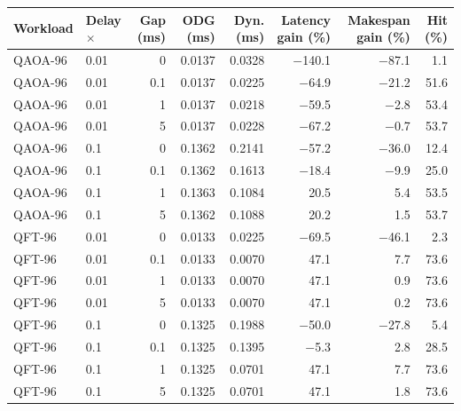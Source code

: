 \begin{tabular}{llrrrrrr}
\toprule
Workload & Delay $\times$ & Gap (ms) & ODG (ms) & Dyn. (ms) & Latency gain (\%) & Makespan gain (\%) & Hit (\%) \\
\midrule
QAOA-96 & 0.01 & 0 & 0.0137 & 0.0328 & $-$140.1 & $-$87.1 & 1.1 \\
QAOA-96 & 0.01 & 0.1 & 0.0137 & 0.0225 & $-$64.9 & $-$21.2 & 51.6 \\
QAOA-96 & 0.01 & 1 & 0.0137 & 0.0218 & $-$59.5 & $-$2.8 & 53.4 \\
QAOA-96 & 0.01 & 5 & 0.0137 & 0.0228 & $-$67.2 & $-$0.7 & 53.7 \\
QAOA-96 & 0.1 & 0 & 0.1362 & 0.2141 & $-$57.2 & $-$36.0 & 12.4 \\
QAOA-96 & 0.1 & 0.1 & 0.1362 & 0.1613 & $-$18.4 & $-$9.9 & 25.0 \\
QAOA-96 & 0.1 & 1 & 0.1363 & 0.1084 & 20.5 & 5.4 & 53.5 \\
QAOA-96 & 0.1 & 5 & 0.1362 & 0.1088 & 20.2 & 1.5 & 53.7 \\
QFT-96 & 0.01 & 0 & 0.0133 & 0.0225 & $-$69.5 & $-$46.1 & 2.3 \\
QFT-96 & 0.01 & 0.1 & 0.0133 & 0.0070 & 47.1 & 7.7 & 73.6 \\
QFT-96 & 0.01 & 1 & 0.0133 & 0.0070 & 47.1 & 0.9 & 73.6 \\
QFT-96 & 0.01 & 5 & 0.0133 & 0.0070 & 47.1 & 0.2 & 73.6 \\
QFT-96 & 0.1 & 0 & 0.1325 & 0.1988 & $-$50.0 & $-$27.8 & 5.4 \\
QFT-96 & 0.1 & 0.1 & 0.1325 & 0.1395 & $-$5.3 & 2.8 & 28.5 \\
QFT-96 & 0.1 & 1 & 0.1325 & 0.0701 & 47.1 & 7.7 & 73.6 \\
QFT-96 & 0.1 & 5 & 0.1325 & 0.0701 & 47.1 & 1.8 & 73.6 \\
\bottomrule
\end{tabular}
